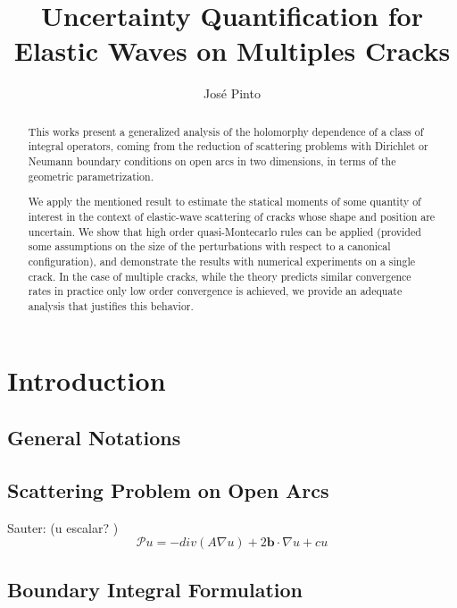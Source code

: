 \documentclass{article}
\title{Uncertainty Quantification for Elastic Waves on Multiples Cracks}
\author{Jos\'e Pinto}
\newcommand{\cP}{\mathcal{P}}
\newcommand{\bb}{\bm{b}}
\begin{document}
\maketitle

\begin{abstract}
This works present a generalized analysis of the holomorphy dependence of a class of integral operators, coming from the reduction of scattering problems with Dirichlet or Neumann boundary conditions on open arcs in two dimensions,  in terms of the geometric parametrization. 

We apply the mentioned result to estimate the statical moments of some quantity of interest in the context of elastic-wave scattering of cracks whose shape and position are uncertain. We show that high order quasi-Montecarlo rules can be applied (provided some assumptions on the size of the perturbations with respect to a canonical configuration), and demonstrate the results with numerical experiments on a single crack. In the case of multiple cracks, while the theory predicts similar convergence rates in practice only low order convergence is achieved, we provide an adequate analysis that justifies this behavior. 
\end{abstract}

\section{Introduction}
\subsection{General Notations}
\subsection{Scattering Problem on Open Arcs}
Sauter: (u escalar? )
$$\cP u = -div(A \nabla u)+2 \bb \cdot \nabla u + c u $$
\subsection{Boundary Integral Formulation}
\end{document}
